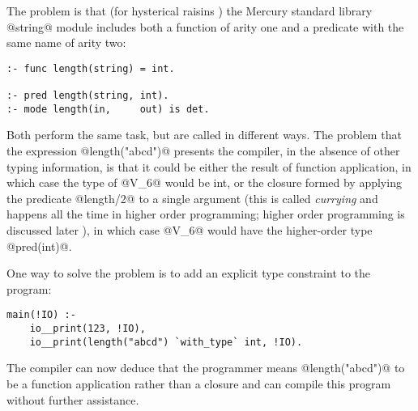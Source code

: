 The problem is that (for hysterical raisins \XXX{}) the Mercury
standard library @string@ module includes both a function of
arity one and a predicate with the same name of arity two:
\begin{verbatim}
:- func length(string) = int.

:- pred length(string, int).
:- mode length(in,     out) is det.
\end{verbatim}
Both perform the same task, but are called in different ways.
The problem that the expression @length("abcd")@ presents the
compiler, in the absence of other typing information, is that
it could be either the result of function application, in
which case the type of @V_6@ would be int, or the closure formed
by applying the predicate @length/2@ to a single argument (this
is called \emph{currying} and happens all the time in higher order
programming; higher order programming is discussed later
\XXX{}), in which case @V_6@ would have the higher-order type
@pred(int)@.

One way to solve the problem is to add an explicit type
constraint to the program:
\begin{verbatim}
main(!IO) :-
    io__print(123, !IO),
    io__print(length("abcd") `with_type` int, !IO).
\end{verbatim}
The compiler can now deduce that the programmer means
@length("abcd")@ to be a function application rather than a
closure and can compile this program without further
assistance.




